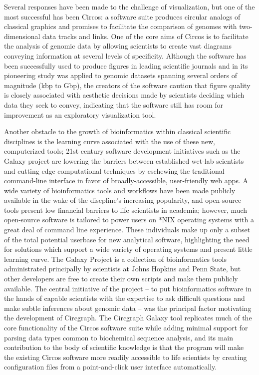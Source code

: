 \documentclass{article}
\begin{document}
Several responses have been made to the challenge of visualization, but one of the most successful has been Circos: a software suite produces circular analogs of classical graphics and promises to facilitate the comparison of genomes with two-dimensional data tracks and links. One of the core aims of Circos is to facilitate the analysis of genomic data by allowing scientists to create vast diagrams conveying information at several levels of specificity. Although the software has been successfully used to produce figures in leading scientific journals and in its pioneering study was applied to genomic datasets spanning several orders of magnitude (kbp to Gbp), the creators of the software caution that figure quality is closely associated with aesthetic decisions made by scientists deciding which data they seek to convey, indicating that the software still has room for improvement as an exploratory visualization tool. 

Another obstacle to the growth of bioinformatics within classical scientific disciplines is the learning curve associated with the use of these new, computerized tools; 21st century software development initiatives such as the Galaxy project are lowering the barriers between established wet-lab scientists and cutting edge computational techniques by eschewing the traditional command-line interface in favor of broadly-accessible, user-friendly web apps. A wide variety of bioinformatics tools and workflows have been made publicly available in the wake of the discpline's increasing popularity, and open-source tools present low financial barriers to life scientists in academia; however, much open-source software is tailored to power users on *NIX operating systems with a great deal of command line experience. These individuals make up only a subset of the total potential userbase for new analytical software, highlighting the need for solutions which support a wide variety of operating systems and present little learning curve. The Galaxy Project is a collection of bioinformatics tools administrated principally by scientists at Johns Hopkins and Penn State, but other developers are free to create their own scripts and make them publicly available. The central initiative of the project -- to put bioinformatics software in the hands of capable scientists with the expertise to ask difficult questions and make subtle inferences about genomic data -- was the principal factor motivating the development of Circgraph. The Circgraph Galaxy tool replicates much of the core functionality of the Circos software suite while adding minimal support for parsing data types common to biochemical sequence analysis, and its main contribution to the body of scientific knowledge is that the program will make the existing Circos software more readily accessible to life scientists by creating configuration files from a point-and-click user interface automatically.  
\end{document}
